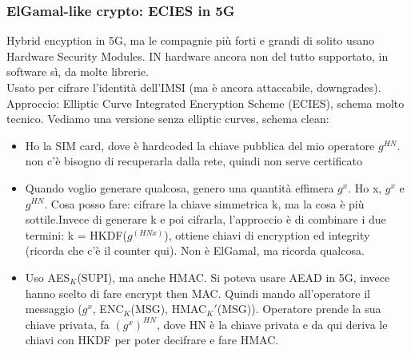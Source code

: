 \documentclass[16px]{article}
\begin{document}
\subsubsection{ElGamal-like crypto: ECIES in 5G}
Hybrid encyption in 5G, ma le compagnie più forti e grandi di solito usano Hardware Security Modules. IN hardware ancora non del tutto supportato, in software sì, da molte librerie.\\ Usato per cifrare l'identità dell'IMSI (ma è ancora attaccabile, downgrades). Approccio: Elliptic Curve Integrated Encryption Scheme (ECIES), schema molto tecnico. Vediamo una versione senza elliptic curves, schema clean:
\begin{itemize}
\item Ho la SIM card, dove è hardcoded la chiave pubblica del mio operatore $g^{HN}$. non c'è bisogno di recuperarla dalla rete, quindi non serve certificato
\item Quando voglio generare qualcosa, genero una quantità effimera $g^x$. Ho x, $g^x$ e $g^{HN}$. Cosa posso fare: cifrare la chiave simmetrica k, ma la cosa è più sottile.Invece di generare k e poi cifrarla, l'approccio è di combinare i due termini: k = HKDF($g^{(HNx)}$), ottiene chiavi di encryption ed integrity (ricorda che c'è il counter qui). Non è ElGamal, ma ricorda qualcosa.
\item Uso AES$_K$(SUPI), ma anche HMAC. Si poteva usare AEAD in 5G, invece hanno scelto di fare encrypt then MAC. Quindi mando all'operatore il messaggio ($g^x$, ENC$_K$(MSG), HMAC$_K'$(MSG)). Operatore prende la sua chiave privata, fa $(g^x)^{HN}$, dove HN è la chiave privata e da qui deriva le chiavi con HKDF per poter decifrare e fare HMAC.
\end{itemize}
\end{document}
